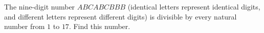 The nine-digit number $ABCABCBBB$ (identical letters represent identical digits, and different letters represent different digits) is divisible by every natural number from $1$ to $17$. Find this number.
